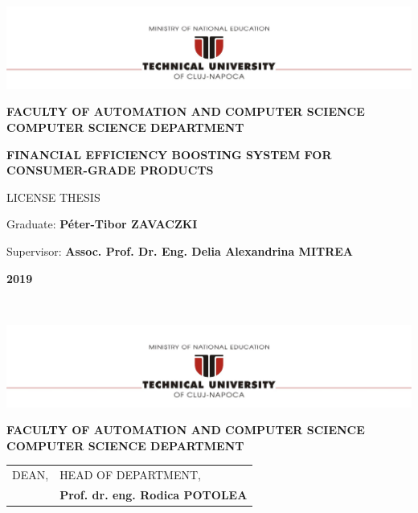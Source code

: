 \documentclass[12pt,a4paper,twoside]{report}
\renewcommand{\thesisauthor}{Péter-Tibor ZAVACZKI}    %
\renewcommand{\thesisyear}{2019}      %
\renewcommand{\thesistitle}{FINANCIAL EFFICIENCY BOOSTING SYSTEM FOR CONSUMER-GRADE PRODUCTS}
\renewcommand{\thesissupervisor}{Assoc. Prof. Dr. Eng. Delia Alexandrina MITREA}
\newcommand{\department}{\bf FACULTY OF AUTOMATION AND COMPUTER SCIENCE\\
COMPUTER SCIENCE DEPARTMENT}
\newcommand{\thesis}{LICENSE THESIS}
\newcommand{\utcnlogo}{\includegraphics[width=15cm]{img/tucn.jpg}}
\begin{document}

\newenvironment{definition}[1][Defini\c{t}ie.]{\begin{trivlist}
    \item[\hskip \labelsep {\bfseries #1}]}{\end{trivlist}}




\setcounter{secnumdepth}{3}


\begin{center}
  \utcnlogo

  \department

  \vspace{4cm}

  {\bf \thesistitle} %

  \vspace{1.5cm}

  \thesis

  \vspace{5.75cm}

  Graduate: {\bf \thesisauthor}

  Supervisor: {\bf \thesissupervisor}

  \vspace{3cm}
  {\bf \thesisyear}
\end{center}

\thispagestyle{empty}
\newpage
$ $
\thispagestyle{empty}
\newpage

\begin{center}
  \utcnlogo

  \department

\end{center}
\vspace{0.5cm}

\begin{tabular}{p{7cm}p{8cm}}
  \hspace{-1cm}DEAN,                             & HEAD OF DEPARTMENT,                 \\
  \hspace{-1cm}{\bf Prof. dr. eng. Liviu MICLEA} & {\bf Prof. dr. eng. Rodica POTOLEA} \\
\end{tabular}
\end{document}
